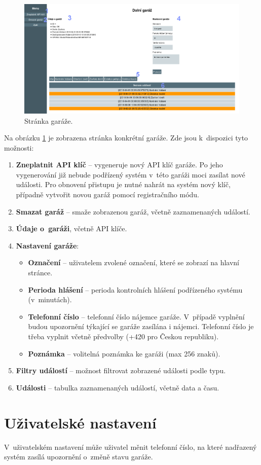 \begin{figure}[h!]
    \centering
    \includegraphics[width=\textwidth]{images/garage_page.png}
    \caption[Stránka garáže]{Stránka garáže.}
    \label{fig:garage_page}
\end{figure}

Na obrázku \ref{fig:garage_page} je zobrazena stránka konkrétní garáže. Zde jsou k~dispozici tyto možnosti:

\begin{enumerate}
    \item \textbf{Zneplatnit API klíč} -- vygeneruje nový API klíč garáže. Po jeho vygenerování již nebude podřízený systém v~této garáži moci zasílat nové události. Pro obnovení přistupu je nutné nahrát na systém nový klíč, případně vytvořit novou garáž pomocí registračního módu.
    \item \textbf{Smazat garáž} -- smaže zobrazenou garáž, včetně zaznamenaných událostí.
    \item \textbf{Údaje o~garáži}, včetně API klíče.
    \item \textbf{Nastavení garáže}:
    \begin{itemize}
        \item \textbf{Označení} -- uživatelem zvolené označení, které se zobrazí na hlavní stránce.
        \item \textbf{Perioda hlášení} -- perioda kontrolních hlášení podřízeného systému (v~minutách).
        \item \textbf{Telefonní číslo} -- telefonní číslo nájemce garáže. V~případě vyplnění budou upozornění týkající se garáže zasílána i nájemci. Telefonní číslo je třeba vyplnit včetně předvolby (+420 pro Českou republiku).
        \item \textbf{Poznámka} -- volitelná poznámka ke garáži (max 256 znaků).
    \end{itemize}
    \item \textbf{Filtry událostí} -- možnost filtrovat zobrazené události podle typu.
    \item \textbf{Události} -- tabulka zaznamenaných událostí, včetně data a času.
\end{enumerate}


\section{Uživatelské nastavení}
\label{sec:guide_user_settings}

V~uživatelském nastavení může uživatel měnit telefonní číslo, na které nadřazený systém zasílá upozornění o~změně stavu garáže.